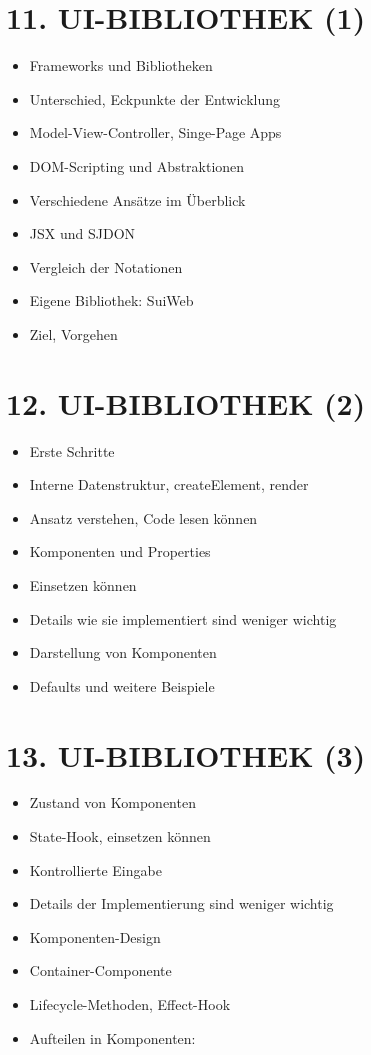\documentclass[10pt]{article}
\begin{document}
\section*{11. UI-BIBLIOTHEK (1)}
\begin{itemize}
  \item Frameworks und Bibliotheken
  \item Unterschied, Eckpunkte der Entwicklung
  \item Model-View-Controller, Singe-Page Apps
  \item DOM-Scripting und Abstraktionen
  \item Verschiedene Ansätze im Überblick
  \item JSX und SJDON
  \item Vergleich der Notationen
  \item Eigene Bibliothek: SuiWeb
  \item Ziel, Vorgehen
\end{itemize}

\section*{12. UI-BIBLIOTHEK (2)}
\begin{itemize}
  \item Erste Schritte
  \item Interne Datenstruktur, createElement, render
  \item Ansatz verstehen, Code lesen können
  \item Komponenten und Properties
  \item Einsetzen können
  \item Details wie sie implementiert sind weniger wichtig
  \item Darstellung von Komponenten
  \item Defaults und weitere Beispiele
\end{itemize}

\section*{13. UI-BIBLIOTHEK (3)}
\begin{itemize}
  \item Zustand von Komponenten
  \item State-Hook, einsetzen können
  \item Kontrollierte Eingabe
  \item Details der Implementierung sind weniger wichtig
  \item Komponenten-Design
  \item Container-Componente
  \item Lifecycle-Methoden, Effect-Hook
  \item Aufteilen in Komponenten:
\end{itemize}
\end{document}
